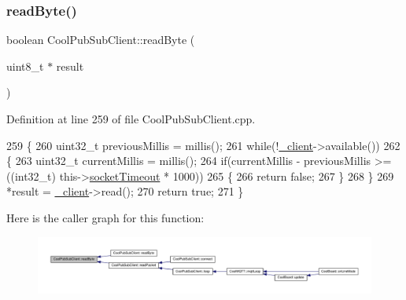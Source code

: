 \mbox{\label{class_cool_pub_sub_client_ad409bbd287d5894f0cf082f62446c002}} 
\subsubsection{\texorpdfstring{read\+Byte()}{readByte()}\hspace{0.1cm}{\footnotesize\ttfamily [1/2]}}
{\footnotesize\ttfamily boolean Cool\+Pub\+Sub\+Client\+::read\+Byte (\begin{DoxyParamCaption}\item[{uint8\+\_\+t $\ast$}]{result }\end{DoxyParamCaption})\hspace{0.3cm}{\ttfamily [private]}}



Definition at line 259 of file Cool\+Pub\+Sub\+Client.\+cpp.


\begin{DoxyCode}
259                                                    \{
260    uint32\_t previousMillis = millis();
261    \textcolor{keywordflow}{while}(!\hyperlink{class_cool_pub_sub_client_a487a65bafb6e3b8e9ab544b13a8878a0}{\_client}->available()) 
262    \{
263      uint32\_t currentMillis = millis();
264      \textcolor{keywordflow}{if}(currentMillis - previousMillis >= ((int32\_t) this->\hyperlink{class_cool_pub_sub_client_a2d7b7c7dda1313ff1492b158c3712630}{socketTimeout} * 1000))
265      \{ 
266        \textcolor{keywordflow}{return} \textcolor{keyword}{false};
267      \}
268    \}
269    *result = \hyperlink{class_cool_pub_sub_client_a487a65bafb6e3b8e9ab544b13a8878a0}{\_client}->read();
270    \textcolor{keywordflow}{return} \textcolor{keyword}{true};
271 \}
\end{DoxyCode}
Here is the caller graph for this function\+:\nopagebreak
\begin{figure}[H]
\begin{center}
\leavevmode
\includegraphics[width=350pt]{d8/d4b/class_cool_pub_sub_client_ad409bbd287d5894f0cf082f62446c002_icgraph}
\end{center}
\end{figure}
\mbox{\label{class_cool_pub_sub_client_abef3735bb9a2a8c87b3da659dc4ade03}} 
